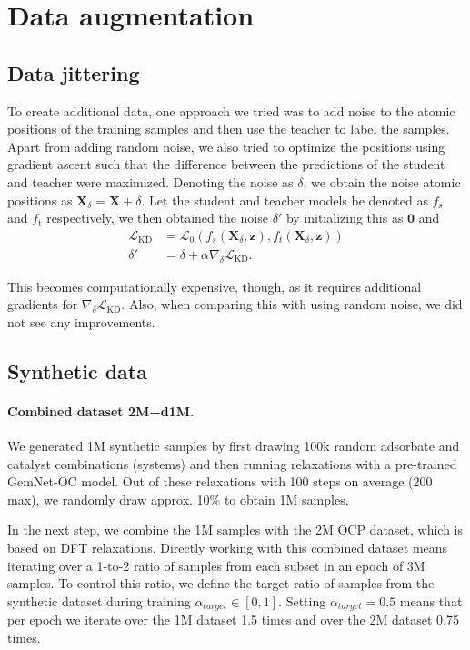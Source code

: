 \documentclass{article}
\newcommand{\loss}{\mathcal{L}}
\begin{document}
\section{Data augmentation}
\label{ap:data_aug}

\subsection{Data jittering} 
\label{ap:jittering}
To create additional data, one approach we tried was to add noise to the atomic positions of the training samples and then use the teacher to label the samples. Apart from adding random noise, we also tried to optimize the positions using gradient ascent such that the difference between the predictions of the student and teacher were maximized. Denoting the noise as $\delta$, we obtain the noise atomic positions as $\boldsymbol{X}_\delta = \boldsymbol{X} + \delta$. Let the student and teacher models be denoted as $f_\text{s}$ and $f_\text{t}$ respectively, we then obtained the noise $\delta'$ by initializing this as $\boldsymbol{0}$ and
\begin{align*}
            \loss_{\text{KD}} &= \loss_0(f_s(\boldsymbol{X}_{\delta}, \boldsymbol{z}), f_t(\boldsymbol{X}_{\delta}, \boldsymbol{z})) \\
            \delta' &= \delta + \alpha \nabla_{\delta} \mathcal{L}_{\text{KD}}.
\end{align*}

This becomes computationally expensive, though, as it requires additional gradients for $\nabla_{\delta} \mathcal{L}_{\text{KD}}$. Also, when comparing this with using random noise, we did not see any improvements.

\subsection{Synthetic data} 
\label{ap:synthetic}

\paragraph{Combined dataset 2M+d1M.}
We generated 1M synthetic samples by first drawing 100k random adsorbate and catalyst combinations (systems) and then running relaxations with a pre-trained GemNet-OC model. Out of these relaxations with 100 steps on average (200 max), we randomly draw approx. 10\% to obtain 1M samples.

In the next step, we combine the 1M samples with the 2M OCP dataset, which is based on DFT relaxations. Directly working with this combined dataset means iterating over a 1-to-2 ratio of samples from each subset in an epoch of 3M samples. To control this ratio, we define the target ratio of samples from the synthetic dataset during training $\alpha_{target}\in[0,1]$. Setting  $\alpha_{target}=0.5$ means that per epoch we iterate over the 1M dataset 1.5 times and over the 2M dataset 0.75 times.
\end{document}
